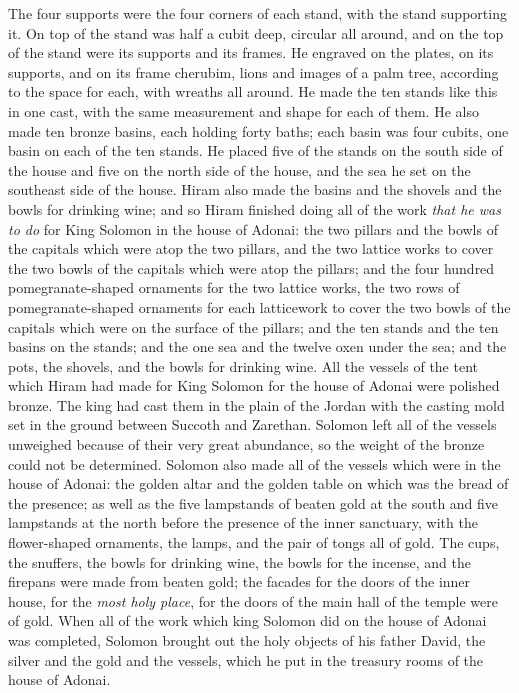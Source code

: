 \begin{biblechapter}
\verse The four supports were the four corners of each stand, with the stand supporting it.
\verse On top of the stand was half a cubit deep, circular all around, and on the top of the stand were its supports and its frames.
\verse He engraved on the plates, on its supports, and on its frame cherubim, lions and images of a palm tree, according to the space for each, with wreaths all around.
\verse He made the ten stands like this in one cast, with the same measurement and shape for each of them.
\verse He also made ten bronze basins, each holding forty baths; each basin was four cubits, one basin on each of the ten stands.
\verse He placed five of the stands on the south side of the house and five on the north side of the house, and the sea he set on the southeast side of the house.
\verse Hiram also made the basins and the shovels and the bowls for drinking wine; and so Hiram finished doing all of the work \textit{that he was to do} for King Solomon in the house of Adonai:
\verse the two pillars and the bowls of the capitals which were atop the two pillars, and the two lattice works to cover the two bowls of the capitals which were atop the pillars;
\verse and the four hundred pomegranate-shaped ornaments for the two lattice works, the two rows of pomegranate-shaped ornaments for each latticework to cover the two bowls of the capitals which were on the surface of the pillars;
\verse and the ten stands and the ten basins on the stands;
\verse and the one sea and the twelve oxen under the sea;
\verse and the pots, the shovels, and the bowls for drinking wine. All the vessels of the tent which Hiram had made for King Solomon for the house of Adonai were polished bronze.
\verse The king had cast them in the plain of the Jordan with the casting mold set in the ground between Succoth and Zarethan.
\verse Solomon left all of the vessels unweighed because of their very great abundance, so the weight of the bronze could not be determined.
\verse Solomon also made all of the vessels which were in the house of Adonai: the golden altar and the golden table on which was the bread of the presence;
\verse as well as the five lampstands of beaten gold at the south and five lampstands at the north before the presence of the inner sanctuary, with the flower-shaped ornaments, the lamps, and the pair of tongs all of gold.
\verse The cups, the snuffers, the bowls for drinking wine, the bowls for the incense, and the firepans were made from beaten gold; the facades for the doors of the inner house, for the \textit{most holy place}, for the doors of the main hall of the temple were of gold.
\verse When all of the work which king Solomon did on the house of Adonai was completed, Solomon brought out the holy objects of his father David, the silver and the gold and the vessels, which he put in the treasury rooms of the house of Adonai.
\end{biblechapter}


